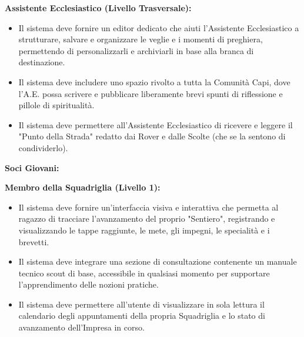 \documentclass[11pt]{article}
\numberwithin{figure}{section}
\begin{document}
\textbf{Assistente Ecclesiastico (Livello Trasversale):}
\begin{itemize}[topsep=0pt]
    \item Il sistema deve fornire un editor dedicato che aiuti l'Assistente Ecclesiastico a strutturare, salvare e organizzare le veglie e i momenti di preghiera, permettendo di personalizzarli e archiviarli in base alla branca di destinazione.
    \item Il sistema deve includere uno spazio rivolto a tutta la Comunità Capi, dove l'A.E. possa scrivere e pubblicare liberamente brevi spunti di riflessione e pillole di spiritualità.
    \item Il sistema deve permettere all'Assistente Ecclesiastico di ricevere e leggere il "Punto della Strada" redatto dai Rover e dalle Scolte (che se la sentono di condividerlo).
\end{itemize}

\vspace{1cm}

\textbf{Soci Giovani:} \newline

\textbf{Membro della Squadriglia (Livello 1):}
\begin{itemize}[topsep=0pt]
    \item Il sistema deve fornire un'interfaccia visiva e interattiva che permetta al ragazzo di tracciare l'avanzamento del proprio "Sentiero", registrando e visualizzando le tappe raggiunte, le mete, gli impegni, le specialità e i brevetti.
    \item Il sistema deve integrare una sezione di consultazione contenente un manuale tecnico scout di base, accessibile in qualsiasi momento per supportare l'apprendimento delle nozioni pratiche.
    \item Il sistema deve permettere all'utente di visualizzare in sola lettura il calendario degli appuntamenti della propria Squadriglia e lo stato di avanzamento dell'Impresa in corso.
\end{itemize}

\vspace{1cm}
\end{document}
